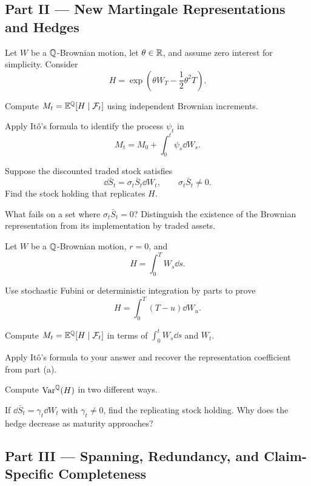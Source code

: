 \subsection*{Part II --- New Martingale Representations and Hedges}

\begin{exercise}
Let \(W\) be a \(\mathbb{Q}\)-Brownian motion, let \(\theta\in\mathbb{R}\), and assume
zero interest for simplicity. Consider
\[
H=\exp\left(\theta W_T-\frac12\theta^2T\right).
\]
\begin{exparts}
  \item Compute \(M_t=\mathbb{E}^{\mathbb{Q}}[H\mid\mathcal{F}_t]\) using independent Brownian
  increments.
  \item Apply It\^o's formula to identify the process \(\psi_t\) in
  \[
  M_t=M_0+\int_0^t\psi_s\dd W_s.
  \]
  \item Suppose the discounted traded stock satisfies
  \[
  \dd\bar S_t=\sigma_t\bar S_t\dd W_t,
  \qquad \sigma_t\bar S_t\neq0.
  \]
  Find the stock holding that replicates \(H\).
  \item What fails on a set where \(\sigma_t\bar S_t=0\)? Distinguish the
  existence of the Brownian representation from its implementation by
  traded assets.
\end{exparts}
\end{exercise}

\begin{exercise}
Let \(W\) be a \(\mathbb{Q}\)-Brownian motion, \(r=0\), and
\[
H=\int_0^T W_s\dd s.
\]
\begin{exparts}
  \item Use stochastic Fubini or deterministic integration by parts to prove
  \[
  H=\int_0^T(T-u)\dd W_u.
  \]
  \item Compute \(M_t=\mathbb{E}^{\mathbb{Q}}[H\mid\mathcal{F}_t]\) in terms of
  \(\int_0^tW_s\dd s\) and \(W_t\).
  \item Apply It\^o's formula to your answer and recover the representation
  coefficient from part (a).
  \item Compute \(\operatorname{Var}^{\mathbb{Q}}(H)\) in two different ways.
  \item If \(\dd\bar S_t=\gamma_t\dd W_t\) with \(\gamma_t\neq0\), find the
  replicating stock holding. Why does the hedge decrease as maturity
  approaches?
\end{exparts}
\end{exercise}

\subsection*{Part III --- Spanning, Redundancy, and Claim-Specific Completeness}

